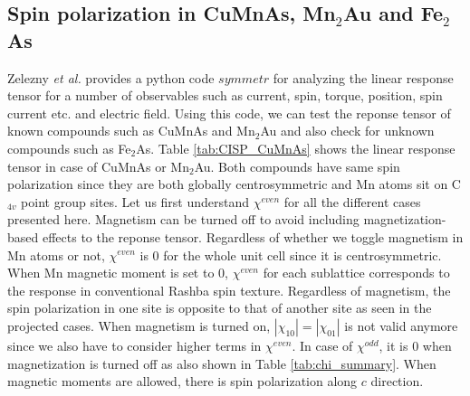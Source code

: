 \documentclass[10pt,doublespacing,edeposit]{uiucthesis2020}
\begin{document}
\begin{mainmatter}
\section{Spin polarization in CuMnAs, Mn$_2$Au and Fe$_2$As}


Zelezny \emph{et al.} \cite{Zelezny2017} provides a python code $symmetr$ for analyzing the linear response tensor for a number of observables such as current, spin, torque, position, spin current etc. and electric field. Using this code, we can test the reponse tensor of known compounds such as CuMnAs and Mn$_2$Au and also check for unknown compounds such as Fe$_2$As. Table \ref{tab:CISP_CuMnAs} shows the linear response tensor in case of CuMnAs or Mn$_2$Au. Both compounds have same spin polarization since they are both globally centrosymmetric and Mn atoms sit on C$_{4v}$ point group sites. Let us first understand $\chi^{even}$ for all the different cases presented here. Magnetism can be turned off to avoid including magnetization-based effects to the reponse tensor. Regardless of whether we toggle magnetism in Mn atoms or not, $\chi^{even}$ is 0 for the whole unit cell since it is centrosymmetric. When Mn magnetic moment is set to 0, $\chi^{even}$ for each sublattice corresponds to the response in conventional Rashba spin texture. Regardless of magnetism, the spin polarization in one site is opposite to that of another site as seen in the projected cases. When magnetism is turned on, $|\chi_{10}| = |\chi_{01}|$ is not valid anymore since we also have to consider higher terms in $\chi^{even}$. In case of $\chi^{odd}$, it is 0 when magnetization is turned off as also shown in Table \ref{tab:chi_summary}. When magnetic moments are allowed, there is spin polarization along $c$ direction.


\end{mainmatter}
\end{document}
